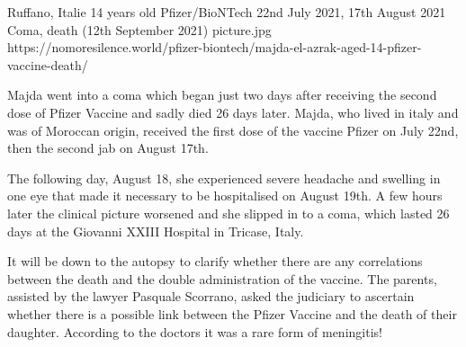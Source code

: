           {Ruffano, Italie}
          {14 years old}
          {Pfizer/BioNTech}
          {22nd July 2021, 17th August 2021}
          {Coma, death (12th September 2021)}
          {picture.jpg}
          {https://nomoresilence.world/pfizer-biontech/majda-el-azrak-aged-14-pfizer-vaccine-death/}
          {

Majda went into a coma which began just two days after receiving the second dose
of Pfizer Vaccine and sadly died 26 days later. Majda, who lived in italy and
was of Moroccan origin, received the first dose of the vaccine Pfizer on July
22nd, then the second jab on August 17th.

The following day, August 18, she experienced severe headache and swelling in
one eye that made it necessary to be hospitalised on August 19th. A few hours
later the clinical picture worsened and she slipped in to a coma, which lasted
26 days at the Giovanni XXIII Hospital in Tricase, Italy.

It will be down to the autopsy to clarify whether there are any correlations
between the death and the double administration of the vaccine. The parents,
assisted by the lawyer Pasquale Scorrano, asked the judiciary to ascertain
whether there is a possible link between the Pfizer Vaccine and the death of
their daughter. According to the doctors it was a rare form of meningitis!

}
